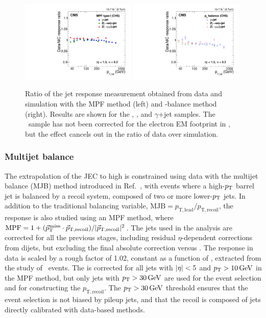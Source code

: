 \documentclass[11pt,twoside,a4paper,cmspaper,final,collab]{cms-tdr}
\begin{document}
\begin{figure}[htbp!]
\begin{center}
\includegraphics[width=0.49\textwidth]{Figure_022-a.pdf}
\includegraphics[width=0.49\textwidth]{Figure_022-b.pdf}
\end{center}
\caption{\label{fig:absscale_ratio}
Ratio of the jet response measurement obtained from data and simulation with the MPF method (left) and \pt-balance method (right).
Results are shown for the \zmmjet, \zeejet, and $\gamma$+jet samples.
The \zeejet\ sample has not been corrected for the electron EM footprint in \ptvecmiss, but the effect cancels out in the ratio of data over simulation.
}
\end{figure}


\subsubsection*{Multijet balance}
\label{sec:mjb}

The extrapolation of the JEC to high \pt is constrained using data with the multijet balance (MJB) method introduced in
Ref.~\cite{Aad:2011he}, with events where a high-$p_{\mathrm{T}}$ barrel jet is balanced by a recoil system,
composed of two or more lower-$p_{\mathrm{T}}$ jets. In addition to the traditional balancing variable, $\mathrm{MJB}=p_\mathrm{T, lead}/p_\mathrm{T, recoil}$,
the response is also studied using an MPF method, where $\mathrm{MPF} = 1 + ({\vec p}_{\mathrm{T}}^{\kern1pt\text{miss}}\cdot\vec{p}_\mathrm{T, recoil})/|\vec{p}_\mathrm{T, recoil}|^{2}$.
The jets used in the analysis are corrected for all the previous stages, including residual $\eta$-dependent corrections from dijets, but excluding the final absolute correction versus \pt. The response in data is scaled by a rough factor of 1.02, constant as a function of \pt,  extracted from the study of \zmmjet\ events. The \ptvecmiss is corrected for all jets with $\lvert \eta \rvert<5$ and $p_{\mathrm{T}}>10\,\text{Ge\hspace{-.08em}V}$ in the MPF method, but only jets with $p_{\mathrm{T}}>30\,\text{Ge\hspace{-.08em}V}$ are used for the event selection and for constructing the  $p_\mathrm{T,recoil}$.
The $p_{\mathrm{T}}>30\,\text{Ge\hspace{-.08em}V}$ threshold ensures that the event selection is not biased by pileup jets, and that the recoil is composed of jets directly calibrated with data-based methods.
\end{document}

